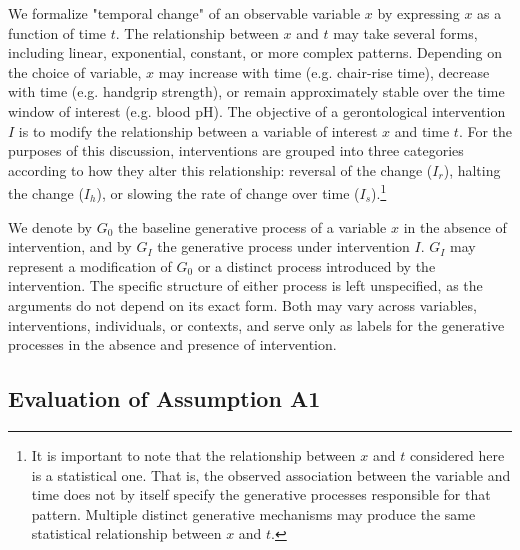 \documentclass[twocolumn]{article} %
\begin{document}
We formalize "temporal change" of an observable variable $x$ by expressing $x$ as a function of time $t$. The relationship between $x$ and $t$ may take several forms, including linear, exponential, constant, or more complex patterns. Depending on the choice of variable, $x$ may increase with time (e.g. chair-rise time), decrease with time (e.g. handgrip strength), or remain approximately stable over the time window of interest (e.g. blood pH). The objective of a gerontological intervention $I$ is to modify the relationship between a variable of interest $x$ and time $t$. For the purposes of this discussion, interventions are grouped into three categories according to how they alter this relationship: reversal of the change ($I_r$), halting the change ($I_h$), or slowing the rate of change over time ($I_s$).\footnote{It is important to note that the relationship between $x$ and $t$ considered here is a statistical one. That is, the observed association between the variable and time does not by itself specify the generative processes responsible for that pattern. Multiple distinct generative mechanisms may produce the same statistical relationship between $x$ and $t$.}

We denote by $G_0$ the baseline generative process of a variable $x$ in the absence of intervention, and by $G_I$ the generative process under intervention $I$. $G_I$ may represent a modification of $G_0$ or a distinct process introduced by the intervention. The specific structure of either process is left unspecified, as the arguments do not depend on its exact form. Both may vary across variables, interventions, individuals, or contexts, and serve only as labels for the generative processes in the absence and presence of intervention.
\subsection{Evaluation of Assumption A1}
\end{document}
